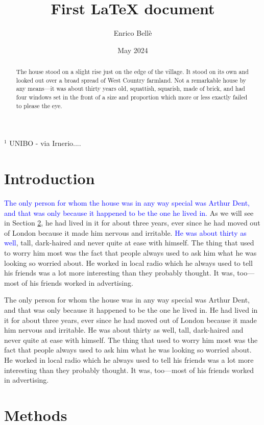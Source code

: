 \documentclass[a4paper, 12pt]{article}
\title{First LaTeX document}
\author{Enrico Bellè}
\date{May 2024}
\newcommand{\tb}{\textcolor{blue}}
\begin{document}
\maketitle

$^1$ UNIBO - via Irnerio....

\tableofcontents

\begin{abstract}
The house stood on a slight rise just on the edge of the village. It stood on its own and looked out over a broad spread of West Country farmland. Not a remarkable house by any means—it was about thirty years old, squattish, squarish, made of brick, and had four windows set in the front of a size and proportion which more or less exactly failed to please the eye.
\end{abstract}

\section{Introduction} %

\tb{The only person for whom the house was in any way special was Arthur Dent, and that was only because it happened to be the one he lived in.} As we will see in Section \ref{sec:methods}, he had lived in it for about three years, ever since he had moved out of London because it made him nervous and irritable. \tb{He was about thirty as well}, tall, dark-haired and never quite at ease with himself. The thing that used to worry him most was the fact that people always used to ask him what he was looking so worried about. He worked in local radio which he always used to tell his friends was a lot more interesting than they probably thought. It was, too—most of his friends worked in advertising.

The only person for whom the house was in any way special was Arthur Dent, and that was only because it happened to be the one he lived in. He had lived in it for about three years, ever since he had moved out of London because it made him nervous and irritable. He was about thirty as well, tall, dark-haired and never quite at ease with himself. The thing that used to worry him most was the fact that people always used to ask him what he was looking so worried about. He worked in local radio which he always used to tell his friends was a lot more interesting than they probably thought. It was, too—most of his friends worked in advertising.

\section{Methods}\label{sec:methods}
\end{document}
